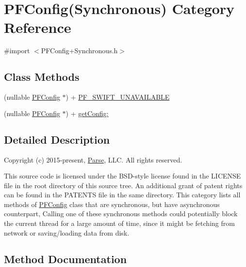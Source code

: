 \hypertarget{category_p_f_config_07_synchronous_08}{}\section{P\+F\+Config(Synchronous) Category Reference}
\label{category_p_f_config_07_synchronous_08}


{\ttfamily \#import $<$P\+F\+Config+\+Synchronous.\+h$>$}

\subsection*{Class Methods}
\begin{DoxyCompactItemize}
\item 
(nullable \hyperlink{interface_p_f_config}{P\+F\+Config} $\ast$) + \hyperlink{category_p_f_config_07_synchronous_08_a5428cf4c7686dd9c214a6fee6dcf28f6}{P\+F\+\_\+\+S\+W\+I\+F\+T\+\_\+\+U\+N\+A\+V\+A\+I\+L\+A\+B\+L\+E}
\begin{DoxyCompactList}\small\item\em 

 \end{DoxyCompactList}\item 
(nullable \hyperlink{interface_p_f_config}{P\+F\+Config} $\ast$) + \hyperlink{category_p_f_config_07_synchronous_08_a90f9c38de2621c7d624326f14b5ec558}{get\+Config\+:}
\end{DoxyCompactItemize}


\subsection{Detailed Description}
Copyright (c) 2015-\/present, \hyperlink{interface_parse}{Parse}, L\+L\+C. All rights reserved.

This source code is licensed under the B\+S\+D-\/style license found in the L\+I\+C\+E\+N\+S\+E file in the root directory of this source tree. An additional grant of patent rights can be found in the P\+A\+T\+E\+N\+T\+S file in the same directory. This category lists all methods of {\ttfamily \hyperlink{interface_p_f_config}{P\+F\+Config}} class that are synchronous, but have asynchronous counterpart, Calling one of these synchronous methods could potentially block the current thread for a large amount of time, since it might be fetching from network or saving/loading data from disk. 

\subsection{Method Documentation}
\hypertarget{category_p_f_config_07_synchronous_08_a90f9c38de2621c7d624326f14b5ec558}{}
